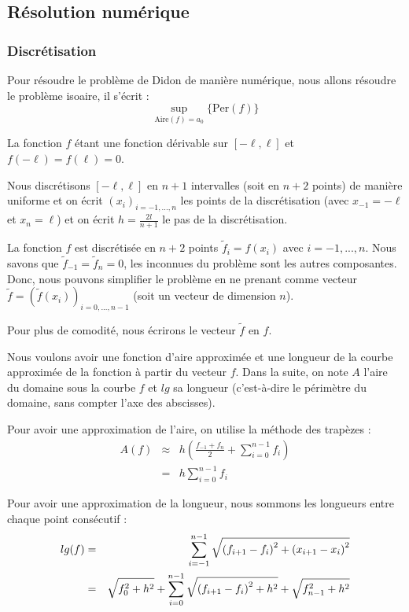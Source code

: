 \documentclass[10pt,a4paper]{article}
\newcommand{\A}{\mathrm{Aire}}
\newcommand{\p}{\mathrm{Per}}
\renewcommand{\ss}{\vspace*{\baselineskip}}
\theoremstyle{plain}
\theoremstyle{definition}
\begin{document}
\subsection{Résolution numérique}

\subsubsection{Discrétisation}

Pour résoudre le problème de Didon de manière numérique, nous allons résoudre le problème isoaire, il s'écrit :
\[ \sup_{\A(f)=a_0} \{ \p(f) \} \]

La fonction $f$ étant une fonction dérivable sur $[-\ell, \ell]$ et $f(-\ell)=f(\ell)=0$.

Nous discrétisons $[-\ell, \ell]$ en $n+1$ intervalles (soit en $n+2$ points) de manière uniforme et on écrit $(x_i)_{i=-1,...,n}$ les points de la discrétisation (avec  $x_{-1}=-\ell$ et $x_n=\ell$) et on écrit $h=\frac{2l}{n+1}$ le pas de la discrétisation.

La fonction $f$ est discrétisée en $n+2$ points $\tilde{f}_i = f(x_i)$ avec $i=-1,...,n$. Nous savons que $\tilde{f}_{-1} = \tilde{f}_n = 0$, les inconnues du problème sont les autres composantes. Donc, nous pouvons simplifier le problème en ne prenant comme vecteur $\tilde{f} = (\tilde{f}(x_i))_{i=0,...,n-1}$ (soit un vecteur de dimension $n$).

Pour plus de comodité, nous écrirons le vecteur $\tilde{f}$ en $f$.

\ss

Nous voulons avoir une fonction d'aire approximée et une longueur de la courbe approximée de la fonction à partir du vecteur $f$. Dans la suite, on note $A$ l'aire du domaine sous la courbe $f$ et $lg$ sa longueur (c'est-à-dire le périmètre du domaine, sans compter l'axe des abscisses).

Pour avoir une approximation de l'aire, on utilise la méthode des trapèzes :
\begin{eqnarray*}
A(f) &\approx& h \left(\frac{f_{-1}+f_n}{2} + \sum_{i=0}^{n-1}{f_i}\right) \\
&=& h \sum_{i=0}^{n-1}{f_i}
\end{eqnarray*}

Pour avoir une approximation de la longueur, nous sommons les longueurs entre chaque point consécutif :
\begin{eqnarray*}
lg(f) &=& \sum_{i=-1}^{n-1}{\sqrt{\vphantom{f_n^2}{(f_{i+1}-f_i)}^2+{(x_{i+1}-x_i)}^2}}\\
&=& \sqrt{f_0^2+h^2} + \sum_{i=0}^{n-1}{\sqrt{\vphantom{f_n^2}{(f_{i+1}-f_i)}^2+h^2}} + \sqrt{f_{n-1}^2+h^2} 
\end{eqnarray*}
\end{document}
